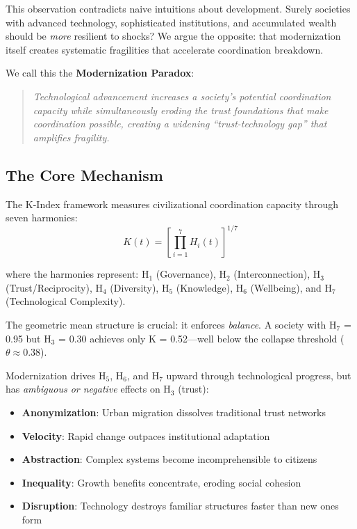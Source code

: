 \documentclass[11pt,a4paper]{article}
\begin{document}
This observation contradicts naive intuitions about development. Surely societies with advanced technology, sophisticated institutions, and accumulated wealth should be \textit{more} resilient to shocks? We argue the opposite: that modernization itself creates systematic fragilities that accelerate coordination breakdown.

We call this the \textbf{Modernization Paradox}:

\begin{quote}
\textit{Technological advancement increases a society's potential coordination capacity while simultaneously eroding the trust foundations that make coordination possible, creating a widening ``trust-technology gap'' that amplifies fragility.}
\end{quote}

\subsection{The Core Mechanism}

The K-Index framework measures civilizational coordination capacity through seven harmonies:
\begin{equation}
K(t) = \left[ \prod_{i=1}^{7} H_i(t) \right]^{1/7}
\end{equation}

where the harmonies represent: H$_1$ (Governance), H$_2$ (Interconnection), H$_3$ (Trust/Reciprocity), H$_4$ (Diversity), H$_5$ (Knowledge), H$_6$ (Wellbeing), and H$_7$ (Technological Complexity).

The geometric mean structure is crucial: it enforces \textit{balance}. A society with H$_7$ = 0.95 but H$_3$ = 0.30 achieves only K = 0.52---well below the collapse threshold ($\theta \approx 0.38$).

Modernization drives H$_5$, H$_6$, and H$_7$ upward through technological progress, but has \textit{ambiguous or negative} effects on H$_3$ (trust):

\begin{itemize}
    \item \textbf{Anonymization}: Urban migration dissolves traditional trust networks
    \item \textbf{Velocity}: Rapid change outpaces institutional adaptation
    \item \textbf{Abstraction}: Complex systems become incomprehensible to citizens
    \item \textbf{Inequality}: Growth benefits concentrate, eroding social cohesion
    \item \textbf{Disruption}: Technology destroys familiar structures faster than new ones form
\end{itemize}
\end{document}

